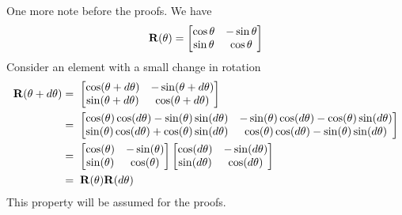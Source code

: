 \documentclass[english]{article}
\begin{document}
One more note before the proofs. We have
\[
{\bf R}(\theta) = \begin{bmatrix} \cos \theta & -\sin \theta  \\
\sin \theta  & \cos \theta \end{bmatrix} 
\]
Consider an element with a small change in rotation
\begin{align*}
{\bf R}(\theta + d\theta)
	&=\; \begin{bmatrix}
			\cos(\theta + d\theta) & -\sin(\theta + d\theta) \\
			\sin(\theta + d\theta) & \cos(\theta + d\theta)
		\end{bmatrix} \\
	&=\; \begin{bmatrix}
			\cos(\theta)\cos(d\theta) - \sin(\theta)\sin(d\theta) & -\sin(\theta)\cos(d\theta) - \cos(\theta)\sin(d\theta) \\
			\sin(\theta)\cos(d\theta) + \cos(\theta)\sin(d\theta) & \cos(\theta)\cos(d\theta) - \sin(\theta)\sin(d\theta)
		\end{bmatrix} \\
	&=\; \begin{bmatrix}
			\cos(\theta) & -\sin(\theta) \\
			\sin(\theta) & \cos(\theta)
		\end{bmatrix} \begin{bmatrix}
			\cos(d\theta) & -\sin(d\theta) \\
			\sin(d\theta) & \cos(d\theta)
		\end{bmatrix} \\
	&=\; {\bf R}(\theta){\bf R}(d\theta)
\end{align*}
This property will be assumed for the proofs. 
\end{document}
